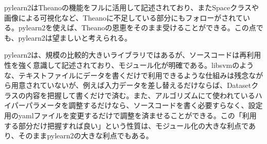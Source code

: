 pylearn2はTheanoの機能をフルに活用して記述されており、またSpaceクラスや画像による可視化など、Theanoに不足している部分にもフォローがされている。pylearn2を使えば、Theanoの恩恵をそのまま受けることができる。この点でも、pylearn2は望ましいと考えられる。\par
pylearn2は、規模の比較的大きいライブラリではあるが、ソースコードは再利用性を強く意識して記述されており、モジュール化が明確である。libsvmのような、テキストファイルにデータを書くだけで利用できるような仕組みは残念ながら用意されていないが、例えば入力データを差し替えるだけならば、Datasetクラスの内容を把握して書くだけで済む。また、アルゴリズムにて使われているハイパーパラメータを調整するだけなら、ソースコードを書く必要すらなく、設定用のyamlファイルを変更するだけで調整を済ませることができる。この「利用する部分だけ把握すれば良い」という性質は、モジュール化の大きな利点であり、そのままpylearn2の大きな利点でもある。